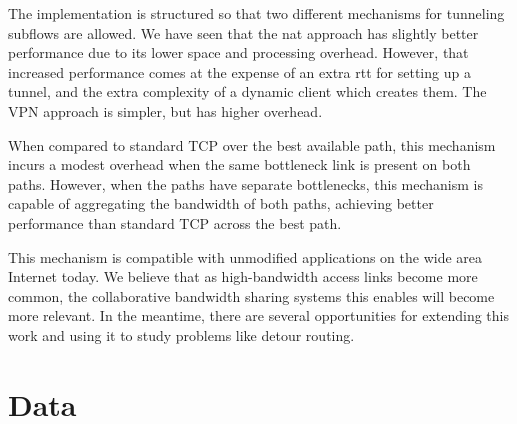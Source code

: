 \documentclass{cwru}
\begin{document}
The implementation is structured so that two different mechanisms for tunneling
subflows are allowed. We have seen that the \ac{nat} approach has slightly
better performance due to its lower space and processing overhead. However, that
increased performance comes at the expense of an extra \ac{rtt} for setting up a
tunnel, and the extra complexity of a dynamic client which creates them. The VPN
approach is simpler, but has higher overhead.

When compared to standard TCP over the best available path, this mechanism
incurs a modest overhead when the same bottleneck link is present on both paths.
However, when the paths have separate bottlenecks, this mechanism is capable of
aggregating the bandwidth of both paths, achieving better performance than
standard TCP across the best path.

This mechanism is compatible with unmodified applications on the wide area
Internet today. We believe that as high-bandwidth access links become more
common, the collaborative bandwidth sharing systems this enables will become
more relevant. In the meantime, there are several opportunities for extending
this work and using it to study problems like detour routing.

\backmatter
\appendix

\chapter{Data}
\end{document}
